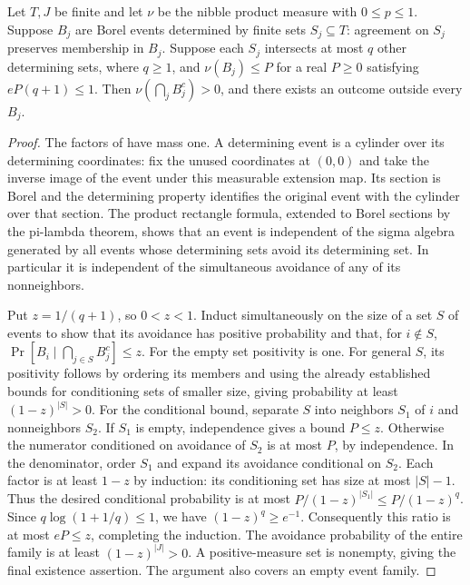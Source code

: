 \begin{lemma}
Let $T,J$ be finite and let $\nu$ be the nibble product measure with
$0\le p\le1$. Suppose $B_j$ are Borel events determined by finite sets
$S_j\subseteq T$: agreement on $S_j$ preserves membership in $B_j$.
Suppose each $S_j$ intersects at most $q$ other determining sets, where
$q\ge1$, and $\nu(B_j)\le P$ for a real $P\ge0$ satisfying
$eP(q+1)\le1$. Then $\nu(\bigcap_j B_j^c)>0$, and there exists an
outcome outside every $B_j$.
\end{lemma}
\begin{proof}
The factors of  have mass one. A determining
event is a cylinder over its determining coordinates: fix the unused
coordinates at $(0,0)$ and take the inverse image of the event under this
measurable extension map. Its section is Borel and the determining property
identifies the original event with the cylinder over that section.
The product rectangle formula, extended to Borel sections by the pi-lambda
theorem, shows that an event is independent of the sigma algebra generated
by all events whose determining sets avoid its determining set. In particular
it is independent of the simultaneous avoidance of any of its nonneighbors.

Put $z=1/(q+1)$, so $0<z<1$.
Induct simultaneously on the size of a set $S$ of events to show that its
avoidance has positive probability and that, for $i\notin S$,
$\Pr[B_i\mid\bigcap_{j\in S}B_j^c]\le z$.
For the empty set positivity is one. For general $S$, its positivity
follows by ordering its members and using the already established bounds
for conditioning sets of smaller size, giving probability at least
$(1-z)^{|S|}>0$.
For the conditional bound, separate $S$ into neighbors $S_1$ of $i$ and
nonneighbors $S_2$. If $S_1$ is empty, independence gives a bound $P\le z$.
Otherwise the numerator conditioned on avoidance of $S_2$ is at most
$P$, by independence. In the denominator, order $S_1$ and expand its
avoidance conditional on $S_2$. Each factor is at least $1-z$ by induction:
its conditioning set has size at most $|S|-1$. Thus the desired conditional
probability is at most $P/(1-z)^{|S_1|}\le P/(1-z)^q$.
Since $q\log(1+1/q)\le1$, we have $(1-z)^q\ge e^{-1}$.
Consequently this ratio is at most $eP\le z$, completing the induction.
The avoidance probability of the entire family is at least
$(1-z)^{|J|}>0$. A positive-measure set is nonempty, giving the final
existence assertion. The argument also covers an empty event family.
\end{proof}
